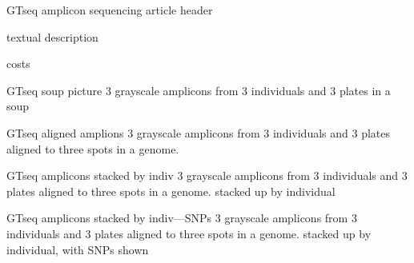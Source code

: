\documentclass[letter,graphicx]{beamer}
\begin{document}
\begin{frame}{GTseq amplicon sequencing}
article header

textual description

costs
\end{frame}








\begin{frame}{GTseq soup picture}
3 grayscale amplicons from 3 individuals and 3 plates in a soup
\end{frame}





\begin{frame}{GTseq aligned amplions}
3 grayscale amplicons from 3 individuals and 3 plates aligned to three
spots in a genome.
\end{frame}




\begin{frame}{GTseq amplicons stacked by indiv}
3 grayscale amplicons from 3 individuals and 3 plates aligned to three
spots in a genome. stacked up by individual
\end{frame}




\begin{frame}{GTseq amplicons stacked by indiv---SNPs}
3 grayscale amplicons from 3 individuals and 3 plates aligned to three
spots in a genome. stacked up by individual, with SNPs shown
\end{frame}
\end{document}
